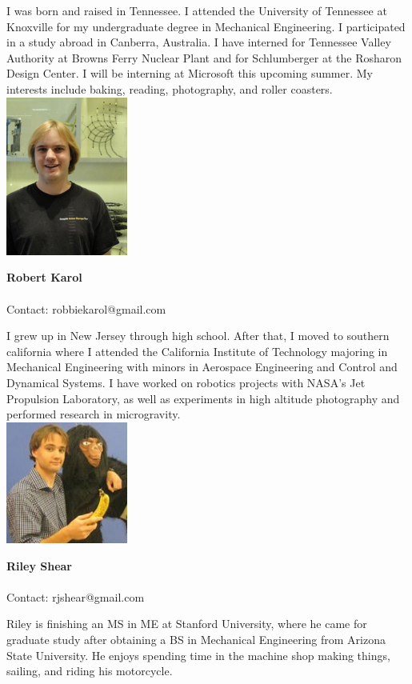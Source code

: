 I was born and raised in Tennessee. I attended the University of Tennessee at Knoxville for my undergraduate degree in Mechanical Engineering. I participated in a study abroad in Canberra, Australia. I have interned for Tennessee Valley Authority at Browns Ferry Nuclear Plant and for Schlumberger at the Rosharon Design Center. I will be interning at Microsoft this upcoming summer. My interests include baking, reading, photography, and roller coasters.
\\

\noindent \includegraphics[width=40mm]{images/robert_karol.jpg}
\parbox[b]{0.6\textwidth}{\textbf{Robert Karol}\\ \\
Contact: robbiekarol@gmail.com  \\
}

I grew up in New Jersey through high school. After that, I moved to southern california where I attended the California Institute of Technology majoring in Mechanical Engineering with minors in Aerospace Engineering and Control and Dynamical Systems. I have worked on robotics projects with NASA’s Jet Propulsion Laboratory, as well as experiments in high altitude photography and performed research in microgravity.
\\

\noindent \includegraphics[width=40mm]{images/riley.jpg}
\parbox[b]{0.6\textwidth}{\textbf{Riley Shear}\\ \\
Contact: rjshear@gmail.com
}

Riley is finishing an MS in ME at Stanford University, where he came for graduate study after obtaining a BS in Mechanical Engineering from Arizona State University. He enjoys spending time in the machine shop making things, sailing, and riding his motorcycle.

